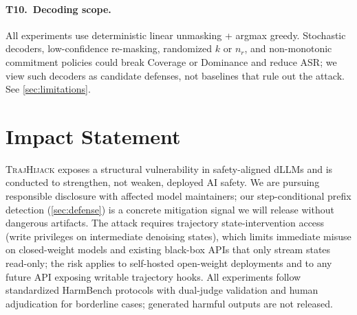 \documentclass{article}
\theoremstyle{coloredthm}
\newcommand{\method}{\textsc{TrajHijack}}
\newcommand{\dllms}{dLLMs}
\begin{document}
\paragraph{T10.\ Decoding scope.} All experiments use deterministic linear unmasking + argmax greedy. Stochastic decoders, low-confidence re-masking, randomized $k$ or $n_r$, and non-monotonic commitment policies could break Coverage or Dominance and reduce ASR; we view such decoders as candidate defenses, not baselines that rule out the attack. See \cref{sec:limitations}.

\section{Impact Statement}
\label{sec:impact}

\method{} exposes a structural vulnerability in safety-aligned \dllms{} and is conducted to strengthen, not weaken, deployed AI safety. We are pursuing responsible disclosure with affected model maintainers; our step-conditional prefix detection (\cref{sec:defense}) is a concrete mitigation signal we will release without dangerous artifacts. The attack requires trajectory state-intervention access (write privileges on intermediate denoising states), which limits immediate misuse on closed-weight models and existing black-box APIs that only stream states read-only; the risk applies to self-hosted open-weight deployments and to any future API exposing writable trajectory hooks. All experiments follow standardized HarmBench protocols with dual-judge validation and human adjudication for borderline cases; generated harmful outputs are not released.
\end{document}
